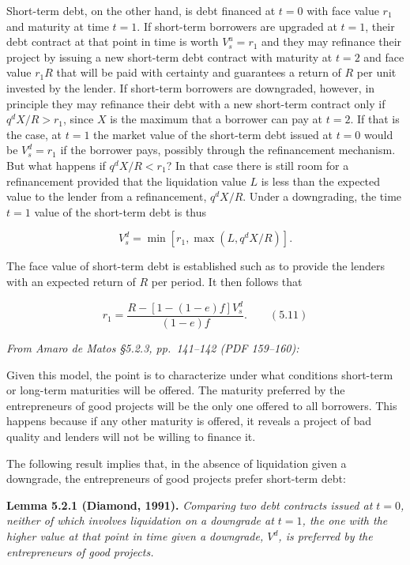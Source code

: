 \documentclass[11pt,a4paper]{article}
\begin{document}
Short-term debt, on the other hand, is debt financed at \(t = 0\) with face value \(r_1\) and
maturity at time \(t = 1\). If short-term borrowers are upgraded at \(t = 1\), their debt contract
at that point in time is worth \(V_s^u = r_1\) and they may refinance their project by issuing a new
short-term debt contract with maturity at \(t = 2\) and face value \(r_1 R\) that will be paid with
certainty and guarantees a return of \(R\) per unit invested by the lender. If short-term borrowers
are downgraded, however, in principle they may refinance their debt with a new short-term contract
only if \(q^d X/R > r_1\), since \(X\) is the maximum that a borrower can pay at \(t = 2\). If that
is the case, at \(t = 1\) the market value of the short-term debt issued at \(t = 0\) would be
\(V_s^d = r_1\) if the borrower pays, possibly through the refinancement mechanism. But what happens
if \(q^d X/R < r_1\)? In that case there is still room for a refinancement provided that the
liquidation value \(L\) is less than the expected value to the lender from a refinancement,
\(q^d X/R\). Under a downgrading, the time \(t = 1\) value of the short-term debt is thus

\[V_s^d = \min\left[r_1, \max(L, q^d X/R)\right].\]

The face value of short-term debt is established such as to provide the lenders with an expected
return of \(R\) per period. It then follows that

\[r_1 = \frac{R - [1 - (1 - e)f]V_s^d}{(1 - e)f}. \qquad (5.11)\]

\emph{From Amaro de Matos §5.2.3, pp.~141--142 (PDF 159--160):}

Given this model, the point is to characterize under what conditions short-term or long-term
maturities will be offered. The maturity preferred by the entrepreneurs of good projects will be the
only one offered to all borrowers. This happens because if any other maturity is offered, it reveals
a project of bad quality and lenders will not be willing to finance it.

The following result implies that, in the absence of liquidation given a downgrade, the
entrepreneurs of good projects prefer short-term debt:

\textbf{Lemma 5.2.1 (Diamond, 1991).} \emph{Comparing two debt contracts issued at \(t = 0\),
neither of which involves liquidation on a downgrade at \(t = 1\), the one with the higher value at
that point in time given a downgrade, \(V^d\), is preferred by the entrepreneurs of good projects.}
\end{document}
